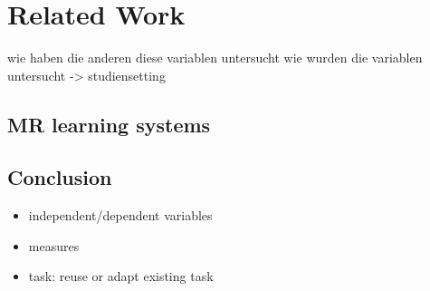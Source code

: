 \chapter{Related Work}
wie haben die anderen diese variablen untersucht
wie wurden die variablen untersucht -> studiensetting
\section{MR learning systems}
\section{Conclusion}
\begin{itemize}
	\item independent/dependent variables
	\item measures
	\item task: reuse or adapt existing task
\end{itemize}